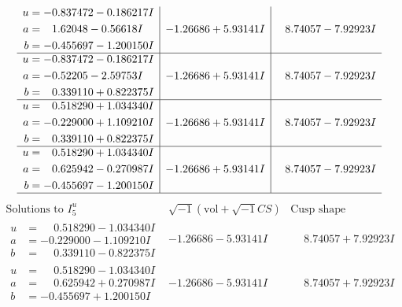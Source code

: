 \documentclass[1p]{elsarticle_modified}
\theoremstyle{definition}
\newcommand{\I}{\sqrt{-1}}
\begin{document}
$$\begin{array}{c|c|c}
\begin{aligned}
u &= -0.837472 - 0.186217 I \\
a &= \phantom{-}1.62048 - 0.56618 I \\
b &= -0.455697 - 1.200150 I\end{aligned}
 & -1.26686 + 5.93141 I & \phantom{-}8.74057 - 7.92923 I \\ \hline\begin{aligned}
u &= -0.837472 - 0.186217 I \\
a &= -0.52205 - 2.59753 I \\
b &= \phantom{-}0.339110 + 0.822375 I\end{aligned}
 & -1.26686 + 5.93141 I & \phantom{-}8.74057 - 7.92923 I \\ \hline\begin{aligned}
u &= \phantom{-}0.518290 + 1.034340 I \\
a &= -0.229000 + 1.109210 I \\
b &= \phantom{-}0.339110 + 0.822375 I\end{aligned}
 & -1.26686 + 5.93141 I & \phantom{-}8.74057 - 7.92923 I \\ \hline\begin{aligned}
u &= \phantom{-}0.518290 + 1.034340 I \\
a &= \phantom{-}0.625942 - 0.270987 I \\
b &= -0.455697 - 1.200150 I\end{aligned}
 & -1.26686 + 5.93141 I & \phantom{-}8.74057 - 7.92923 I\\
 \hline 
 \end{array}$$\newpage$$\begin{array}{c|c|c}  
\text{Solutions to }I^u_{5}& \I (\text{vol} + \sqrt{-1}CS) & \text{Cusp shape}\\
 \hline 
\begin{aligned}
u &= \phantom{-}0.518290 - 1.034340 I \\
a &= -0.229000 - 1.109210 I \\
b &= \phantom{-}0.339110 - 0.822375 I\end{aligned}
 & -1.26686 - 5.93141 I & \phantom{-}8.74057 + 7.92923 I \\ \hline\begin{aligned}
u &= \phantom{-}0.518290 - 1.034340 I \\
a &= \phantom{-}0.625942 + 0.270987 I \\
b &= -0.455697 + 1.200150 I\end{aligned}
 & -1.26686 - 5.93141 I & \phantom{-}8.74057 + 7.92923 I \\ \hline\begin{aligned}

\end{aligned}
\end{array}$$
\end{document}
